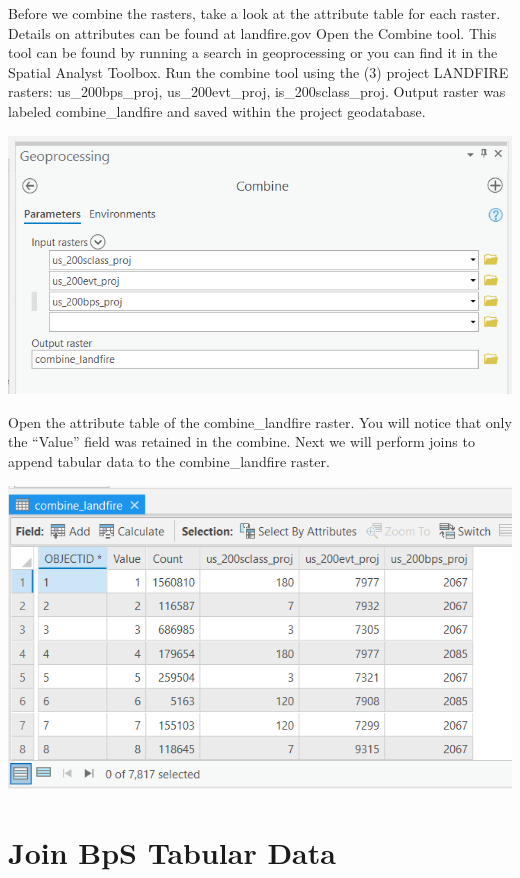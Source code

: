 \documentclass[
]{book}
\begin{document}
Before we combine the rasters, take a look at the attribute table for each raster. Details on attributes can be found at landfire.gov
Open the Combine tool. This tool can be found by running a search in geoprocessing or you can find it in the Spatial Analyst Toolbox. Run the combine tool using the (3) project LANDFIRE rasters: us\_200bps\_proj, us\_200evt\_proj, is\_200sclass\_proj. Output raster was labeled combine\_landfire and saved within the project geodatabase.

\includegraphics[width=1000px]{04_gis_screenshots/6_combine_rasters}

Open the attribute table of the combine\_landfire raster. You will notice that only the ``Value'' field was retained in the combine. Next we will perform joins to append tabular data to the combine\_landfire raster.

\includegraphics[width=1000px]{04_gis_screenshots/7_combine_noattributes}

\hypertarget{join-bps-tabular-data}{%
\section{Join BpS Tabular Data}\label{join-bps-tabular-data}}
\end{document}
